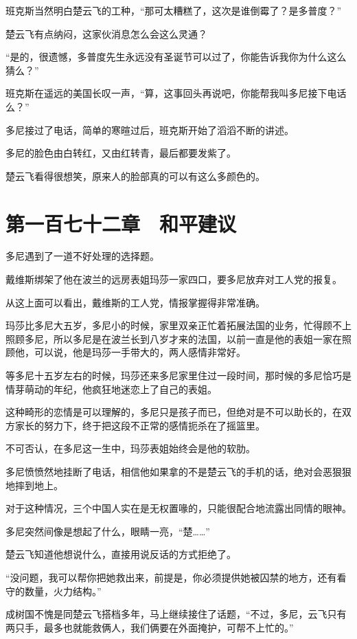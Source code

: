 班克斯当然明白楚云飞的工种，“那可太糟糕了，这次是谁倒霉了？是多普度？”

楚云飞有点纳闷，这家伙消息怎么会这么灵通？

“是的，很遗憾，多普度先生永远没有圣诞节可以过了，你能告诉我你为什么这么猜么？”

班克斯在遥远的美国长叹一声，“算，这事回头再说吧，你能帮我叫多尼接下电话么？”

多尼接过了电话，简单的寒暄过后，班克斯开始了滔滔不断的讲述。

多尼的脸色由白转红，又由红转青，最后都要发紫了。

楚云飞看得很想笑，原来人的脸部真的可以有这么多颜色的。

\section{第一百七十二章　和平建议}

多尼遇到了一道不好处理的选择题。

戴维斯绑架了他在波兰的远房表姐玛莎一家四口，要多尼放弃对工人党的报复。

从这上面可以看出，戴维斯的工人党，情报掌握得非常准确。

玛莎比多尼大五岁，多尼小的时候，家里双亲正忙着拓展法国的业务，忙得顾不上照顾多尼，所以多尼是在波兰长到八岁才来的法国，以前一直是他的表姐一家在照顾他，可以说，他是玛莎一手带大的，两人感情非常好。

等多尼十五岁左右的时候，玛莎还来多尼家里住过一段时间，那时候的多尼恰巧是情芽萌动的年纪，他疯狂地迷恋上了自己的表姐。

这种畸形的恋情是可以理解的，多尼只是孩子而已，但绝对是不可以助长的，在双方家长的努力下，终于把这段不正常的感情扼杀在了摇篮里。

不可否认，在多尼这一生中，玛莎表姐始终会是他的软肋。

多尼愤愤然地挂断了电话，相信他如果拿的不是楚云飞的手机的话，绝对会恶狠狠地摔到地上。

对于这种情况，三个中国人实在是无权置喙的，只能很配合地流露出同情的眼神。

多尼突然间像是想起了什么，眼睛一亮，“楚……”

楚云飞知道他想说什么，直接用说反话的方式拒绝了。

“没问题，我可以帮你把她救出来，前提是，你必须提供她被囚禁的地方，还有看守的数量，火力结构。”

成树国不愧是同楚云飞搭档多年，马上继续接住了话题，“不过，多尼，云飞只有两只手，最多也就能救俩人，我们俩要在外面掩护，可帮不上忙的。”

